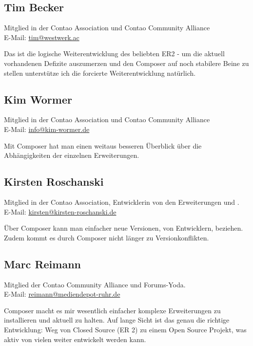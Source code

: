 \documentclass[
paper=a4,
draft=false,%
fontsize=10pt%
]{scrartcl}
\begin{document}
\subsection*{Tim  Becker}

Mitglied in der Contao Association und Contao Community Alliance \\
E-Mail: \href{mailto:tim@westwerk.ac}{tim@westwerk.ac}

Das  ist die logische Weiterentwicklung des beliebten ER2 - um die aktuell vorhandenen Defizite auszumerzen und den Composer auf noch stabilere Beine zu stellen unterstütze ich die forcierte Weiterentwicklung natürlich.

\subsection*{Kim  Wormer}

Mitglied in der Contao Association und Contao Community Alliance \\
E-Mail: \href{mailto:info@kim-wormer.de}{info@kim-wormer.de}

Mit Composer hat man einen weitaus besseren Überblick über die Abhängigkeiten der einzelnen Erweiterungen.

\subsection*{Kirsten  Roschanski}

Mitglied in der Contao Association, Entwicklerin von den Erweiterungen  und .\\
E-Mail: \href{mailto:kirsten@kirsten-roschanski.de}{kirsten@kirsten-roschanski.de}

Über Composer kann man einfacher neue Versionen, von Entwicklern, beziehen.  Zudem kommt es durch Composer nicht länger zu Versionkonflikten.

\subsection*{Marc  Reimann}

Mitglied der Contao Community Alliance und Forums-Yoda.\\
E-Mail: \href{mailto:reimann@mediendepot-ruhr.de}{reimann@mediendepot-ruhr.de}

Composer macht es mir wesentlich einfacher komplexe Erweiterungen zu installieren und aktuell zu halten. Auf lange Sicht ist das genau die richtige Entwicklung: Weg von Closed Source (ER 2) zu einem Open Source Projekt, was aktiv von vielen weiter entwickelt werden kann.
\end{document}
